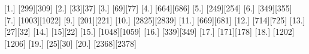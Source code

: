 [1.] [299][309]
[2.] [33][37]
[3.] [69][77]
[4.] [664][686]
[5.] [249][254]
[6.] [349][355]
[7.] [1003][1022]
[9.] [201][221]
[10.] [2825][2839]
[11.] [669][681]
[12.] [714][725]
[13.] [27][32]
[14.] [15][22]
[15.] [1048][1059]
[16.] [339][349]
[17.] [171][178]
[18.] [1202][1206]
[19.] [25][30]
[20.] [2368][2378]
